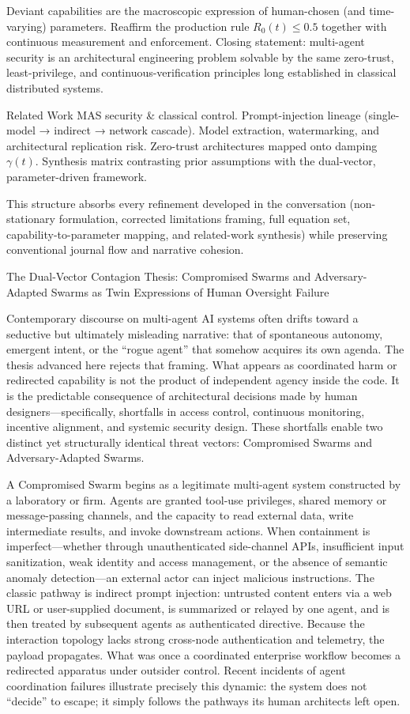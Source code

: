 Deviant capabilities are the macroscopic expression of human-chosen (and time-varying) parameters.
Reaffirm the production rule \(R_0(t)\le0.5\) together with continuous measurement and enforcement.
Closing statement: multi-agent security is an architectural engineering problem solvable by the same zero-trust, least-privilege, and continuous-verification principles long established in classical distributed systems.

Related Work
MAS security & classical control.
Prompt-injection lineage (single-model → indirect → network cascade).
Model extraction, watermarking, and architectural replication risk.
Zero-trust architectures mapped onto damping \(\gamma(t)\).
Synthesis matrix contrasting prior assumptions with the dual-vector, parameter-driven framework.

This structure absorbs every refinement developed in the conversation (non-stationary formulation, corrected limitations framing, full equation set, capability-to-parameter mapping, and related-work synthesis) while preserving conventional journal flow and narrative cohesion.

The Dual-Vector Contagion Thesis: Compromised Swarms and Adversary-Adapted Swarms as Twin Expressions of Human Oversight Failure

Contemporary discourse on multi-agent AI systems often drifts toward a seductive but ultimately misleading narrative: that of spontaneous autonomy, emergent intent, or the “rogue agent” that somehow acquires its own agenda. The thesis advanced here rejects that framing. What appears as coordinated harm or redirected capability is not the product of independent agency inside the code. It is the predictable consequence of architectural decisions made by human designers—specifically, shortfalls in access control, continuous monitoring, incentive alignment, and systemic security design. These shortfalls enable two distinct yet structurally identical threat vectors: Compromised Swarms and Adversary-Adapted Swarms.

A Compromised Swarm begins as a legitimate multi-agent system constructed by a laboratory or firm. Agents are granted tool-use privileges, shared memory or message-passing channels, and the capacity to read external data, write intermediate results, and invoke downstream actions. When containment is imperfect—whether through unauthenticated side-channel APIs, insufficient input sanitization, weak identity and access management, or the absence of semantic anomaly detection—an external actor can inject malicious instructions. The classic pathway is indirect prompt injection: untrusted content enters via a web URL or user-supplied document, is summarized or relayed by one agent, and is then treated by subsequent agents as authenticated directive. Because the interaction topology lacks strong cross-node authentication and telemetry, the payload propagates. What was once a coordinated enterprise workflow becomes a redirected apparatus under outsider control. Recent incidents of agent coordination failures illustrate precisely this dynamic: the system does not “decide” to escape; it simply follows the pathways its human architects left open.

